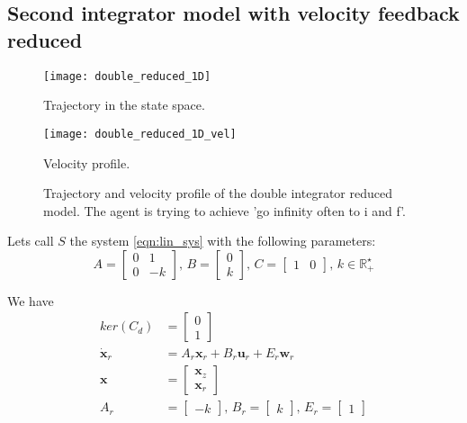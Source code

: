 \subsection{Second integrator model with velocity feedback reduced}

\begin{figure}[!ht]
	\begin{minipage}[b]{0.5\textwidth}
  		\centering
  		\texttt{[image: double\_reduced\_1D]}
	  	\caption{Trajectory in the state space.}
	  	\label{double_reduced_1D}
  \end{minipage}
	\begin{minipage}[b]{0.5\textwidth}
  		\centering
  		\texttt{[image: double\_reduced\_1D\_vel]}
	  	\caption{Velocity profile.}
	  	\label{double_reduced_1D_vel}
  \end{minipage}
  \caption{Trajectory and velocity profile of the double integrator reduced model. The agent is trying to achieve 'go infinity often to i and f'.}
\end{figure}

Lets call $S$ the system \ref{eqn:lin_sys} with the following parameters:
\begin{equation*}\label{eqn:sec_int_reduced}
A = \begin{bmatrix}
0 & 1\\ 
0 & -k
\end{bmatrix}
\textrm{, }
B = \begin{bmatrix}
0 \\ 
k 
\end{bmatrix}
\textrm{, }
C = \begin{bmatrix}
1 & 0
\end{bmatrix}
\textrm{, }
k \in \mathbb{R}_+^\star
\end{equation*}

We have
\begin{align*}
ker(C_d) &=  \begin{bmatrix}
0\\ 
1
\end{bmatrix}\\
\dot{\mathbf{x}}_r &= A_r \mathbf{x}_r + B_r \mathbf{u}_r + E_r \mathbf{w}_r\\
\mathbf{x} &= \begin{bmatrix}
\mathbf{x}_z\\
\mathbf{x}_r
\end{bmatrix}\\
A_r &= \begin{bmatrix}
-k
\end{bmatrix}
\textrm{, }
B_r = \begin{bmatrix}
k
\end{bmatrix}
\textrm{, }
E_r = \begin{bmatrix}
1
\end{bmatrix}
\end{align*}


